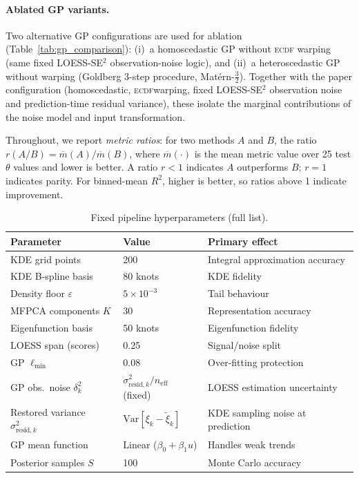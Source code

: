 \documentclass[12pt,a4paper]{article}
\newcommand{\ECDF}{\textsc{ecdf}}
\newcommand{\spar}{\theta}
\begin{document}
\paragraph{Ablated GP variants.}
Two alternative GP configurations are used for ablation
(Table~\ref{tab:gp_comparison}): (i)~a homoscedastic GP without \ECDF
warping (same fixed LOESS-SE$^2$ observation-noise logic), and
(ii)~a heteroscedastic GP without warping (Goldberg 3-step procedure,
Mat\'{e}rn-$\frac{3}{2}$).  Together with the paper configuration
(homoscedastic, \ECDF warping, fixed LOESS-SE$^2$ observation noise
and prediction-time residual variance), these isolate
the marginal contributions of the noise model and input transformation.

Throughout, we report \emph{metric ratios}: for two methods $A$ and
$B$, the ratio $r(A/B) = \overline{m}(A)/\overline{m}(B)$, where
$\overline{m}(\cdot)$ is the mean metric value over 25 test $\spar$
values and lower is better.  A ratio $r < 1$ indicates $A$ outperforms
$B$; $r = 1$ indicates parity.  For binned-mean $R^2$, higher is better,
so ratios above 1 indicate improvement.

\begin{table}[htbp]
  \centering
  \caption{Fixed pipeline hyperparameters (full list).}
  \label{tab:hyperparams}
  \begin{tabular}{lll}
    \toprule
    Parameter & Value & Primary effect \\
    \midrule
    KDE grid points            & 200   & Integral approximation accuracy \\
    KDE B-spline basis         & 80 knots & KDE fidelity \\
    Density floor $\varepsilon$ & $5\times10^{-3}$ & Tail behaviour \\
    MFPCA components $K$       & 30    & Representation accuracy \\
    Eigenfunction basis        & 50 knots & Eigenfunction fidelity \\
    LOESS span (scores)        & 0.25  & Signal/noise split \\
    GP $\ell_\mathrm{min}$     & 0.08  & Over-fitting protection \\
    GP obs.\ noise $\delta_k^2$ & $\sigma^2_{\mathrm{resid},k}/n_\mathrm{eff}$ (fixed) & LOESS estimation uncertainty \\
    Restored variance $\sigma^2_{\mathrm{resid},k}$ & $\mathrm{Var}[\xi_k-\tilde{\xi}_k]$ & KDE sampling noise at prediction \\
    GP mean function           & Linear ($\beta_0+\beta_1 u$) & Handles weak trends \\
    Posterior samples $S$      & 100   & Monte Carlo accuracy \\
    \bottomrule
  \end{tabular}
\end{table}
\end{document}
